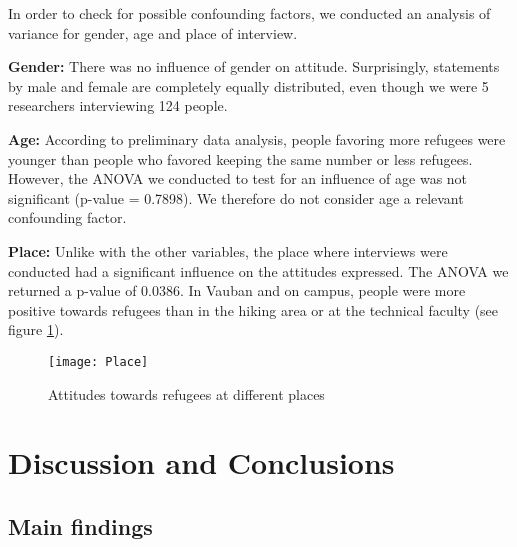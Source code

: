 \documentclass{article}
\begin{document}
In order to check for possible confounding factors, we conducted an analysis of variance for gender, age and place of interview.

\textbf{Gender:} There was no influence of gender on attitude. Surprisingly, statements by male and female are completely equally distributed, even though we were 5 researchers interviewing 124 people. 

\textbf{Age:} According to preliminary data analysis, people favoring more refugees were younger than people who favored keeping the same number or less refugees. However, the ANOVA we conducted to test for an influence of age was not significant (p-value = 0.7898). We therefore do not consider age a relevant confounding factor.

\textbf{Place:} Unlike with the other variables, the place where interviews were conducted had a significant influence on the attitudes expressed. The ANOVA we returned a p-value of 0.0386.
In Vauban and on campus, people were more positive towards refugees than in the hiking area or at the technical faculty (see figure \ref{fig: Place}).

\begin{figure}
	\centering 
	\texttt{[image: Place]}
	\caption{Attitudes towards refugees at different places}\label{fig: Place}
\end{figure}


\section{Discussion and Conclusions}

\subsection{Main findings}
\end{document}
